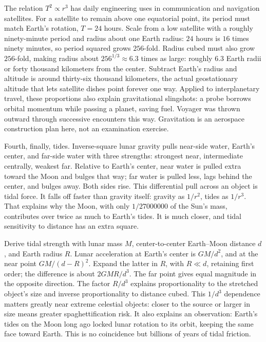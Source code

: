 The relation \(T^{2} \propto r^{3}\) has daily engineering uses in communication and navigation satellites. For a satellite to remain above one equatorial point, its period must match Earth's rotation, \(T = 24\) hours. Scale from a low satellite with a roughly ninety-minute period and radius about one Earth radius: \(24\) hours is \(16\) times ninety minutes, so period squared grows \(256\)-fold. Radius cubed must also grow \(256\)-fold, making radius about \(256^{1/3} \approx 6.3\) times as large: roughly 6.3 Earth radii or forty thousand kilometers from the center. Subtract Earth's radius and altitude is around thirty-six thousand kilometers, the actual geostationary altitude that lets satellite dishes point forever one way. Applied to interplanetary travel, these proportions also explain gravitational slingshots: a probe borrows orbital momentum while passing a planet, saving fuel. Voyager was thrown outward through successive encounters this way. Gravitation is an aerospace construction plan here, not an examination exercise.

Fourth, finally, tides. Inverse-square lunar gravity pulls near-side water, Earth's center, and far-side water with three strengths: strongest near, intermediate centrally, weakest far. Relative to Earth's center, near water is pulled extra toward the Moon and bulges that way; far water is pulled less, lags behind the center, and bulges away. Both sides rise. This differential pull across an object is tidal force. It falls off faster than gravity itself: gravity as \(1/r^{2}\), tides as \(1/r^{3}\). That explains why the Moon, with only \(1/27000000\) of the Sun's mass, contributes over twice as much to Earth's tides. It is much closer, and tidal sensitivity to distance has an extra square.

\begin{challenge}
Derive tidal strength with lunar mass \(M\), center-to-center Earth--Moon distance \(d\), and Earth radius \(R\). Lunar acceleration at Earth's center is \(GM/d^{2}\), and at the near point \(GM/(d-R)^{2}\). Expand the latter in \(R\), with \(R \ll d\), retaining first order; the difference is about \(2GMR/d^{3}\). The far point gives equal magnitude in the opposite direction. The factor \(R/d^{3}\) explains proportionality to the stretched object's size and inverse proportionality to distance cubed. This \(1/d^{3}\) dependence matters greatly near extreme celestial objects: closer to the source or larger in size means greater spaghettification risk. It also explains an observation: Earth's tides on the Moon long ago locked lunar rotation to its orbit, keeping the same face toward Earth. This is no coincidence but billions of years of tidal friction.
\end{challenge}

